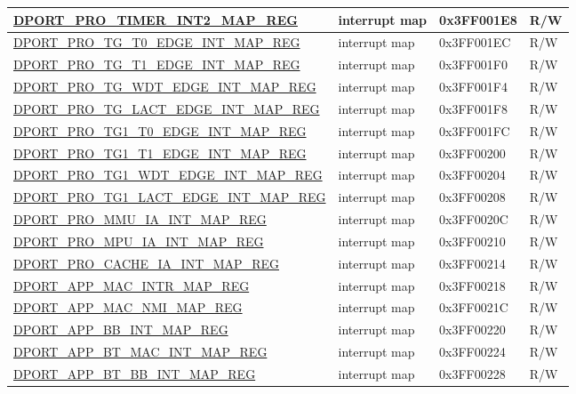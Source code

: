 \begin{longtable}{ |L{8.2cm} | L{4.5cm} | l | l | }
\hyperref[regdesc:PROTIMERINT2MAPREG]{DPORT\_PRO\_TIMER\_INT2\_MAP\_REG} & interrupt map & 0x3FF001E8 & R/W \\ \hline
\hyperref[regdesc:PROTGT0EDGEINTMAPREG]{DPORT\_PRO\_TG\_T0\_EDGE\_INT\_MAP\_REG} & interrupt map & 0x3FF001EC & R/W \\ \hline
\hyperref[regdesc:PROTGT1EDGEINTMAPREG]{DPORT\_PRO\_TG\_T1\_EDGE\_INT\_MAP\_REG} & interrupt map & 0x3FF001F0 & R/W \\ \hline
\hyperref[regdesc:PROTGWDTEDGEINTMAPREG]{DPORT\_PRO\_TG\_WDT\_EDGE\_INT\_MAP\_REG} & interrupt map & 0x3FF001F4 & R/W \\ \hline
\hyperref[regdesc:PROTGLACTEDGEINTMAPREG]{DPORT\_PRO\_TG\_LACT\_EDGE\_INT\_MAP\_REG} & interrupt map & 0x3FF001F8 & R/W \\ \hline
\hyperref[regdesc:PROTG1T0EDGEINTMAPREG]{DPORT\_PRO\_TG1\_T0\_EDGE\_INT\_MAP\_REG} & interrupt map & 0x3FF001FC & R/W \\ \hline
\hyperref[regdesc:PROTG1T1EDGEINTMAPREG]{DPORT\_PRO\_TG1\_T1\_EDGE\_INT\_MAP\_REG} & interrupt map & 0x3FF00200 & R/W \\ \hline
\hyperref[regdesc:PROTG1WDTEDGEINTMAPREG]{DPORT\_PRO\_TG1\_WDT\_EDGE\_INT\_MAP\_REG} & interrupt map & 0x3FF00204 & R/W \\ \hline
\hyperref[regdesc:PROTG1LACTEDGEINTMAPREG]{DPORT\_PRO\_TG1\_LACT\_EDGE\_INT\_MAP\_REG} & interrupt map & 0x3FF00208 & R/W \\ \hline
\hyperref[regdesc:PROMMUIAINTMAPREG]{DPORT\_PRO\_MMU\_IA\_INT\_MAP\_REG} & interrupt map & 0x3FF0020C & R/W \\ \hline
\hyperref[regdesc:PROMPUIAINTMAPREG]{DPORT\_PRO\_MPU\_IA\_INT\_MAP\_REG} & interrupt map & 0x3FF00210 & R/W \\ \hline
\hyperref[regdesc:PROCACHEIAINTMAPREG]{DPORT\_PRO\_CACHE\_IA\_INT\_MAP\_REG} & interrupt map & 0x3FF00214 & R/W \\ \hline
\hyperref[regdesc:APPMACINTRMAPREG]{DPORT\_APP\_MAC\_INTR\_MAP\_REG} & interrupt map & 0x3FF00218 & R/W \\ \hline
\hyperref[regdesc:APPMACNMIMAPREG]{DPORT\_APP\_MAC\_NMI\_MAP\_REG} & interrupt map & 0x3FF0021C & R/W \\ \hline
\hyperref[regdesc:APPBBINTMAPREG]{DPORT\_APP\_BB\_INT\_MAP\_REG} & interrupt map & 0x3FF00220 & R/W \\ \hline
\hyperref[regdesc:APPBTMACINTMAPREG]{DPORT\_APP\_BT\_MAC\_INT\_MAP\_REG} & interrupt map & 0x3FF00224 & R/W \\ \hline
\hyperref[regdesc:APPBTBBINTMAPREG]{DPORT\_APP\_BT\_BB\_INT\_MAP\_REG} & interrupt map & 0x3FF00228 & R/W \\ \hline

\end{longtable}
